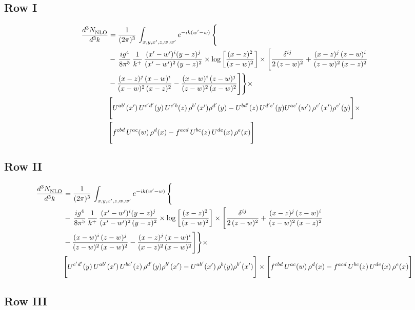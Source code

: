 \documentclass[9pt]{article}
\numberwithin{equation}{section}
\begin{document}
\subsection{Row I}
\begin{align}
     \frac{d^{3}N_{\rm NLO}^{\rm}}{d^{3}k}  & =   \frac{1}{(2\pi)^{3}}\, \int_{x,y,x',z,w,w^{\prime}} e^{-ik(w^{\prime}-w)}\, \Bigg\{\notag \\
& -\,\frac{ig^{4}}{8\pi^{5}}\,\frac{1}{k^{+}}\,\frac{(x'-w')^{i}(y-z)^{j}}{(x'-w')^{2}\,(y-z)^{2}}\times \log{\left[\frac{(x-z)^{2}}{(x-w)^{2}}\right]}\times \Bigg[\frac{\delta^{ij}}{2\,(z-w)^{2}}+\frac{(x-z)^{j}\,(z-w)^{i}}{(z-w)^{2}\,(x-z)^{2}}\notag \\ & -\frac{(x-z)^{j}\,(x-w)^{i}}{(x-w)^{2}\,(x-z)^{2}}-\frac{(x-w)^{i}\,(z-w)^{j}}{(z-w)^{2}\,(x-w)^{2}}\Bigg]\Bigg\}\times \notag \\ &  \Bigg[U^{ab'}(x')\,U^{c'd'}(y)\,U^{c'b}(z)\,\rho^{b'}(x')\rho^{d'}(y)-U^{bd'}(z)\,U^{d'e'}(y)U^{ac'}(w')\,\rho^{c'}(x')\rho^{e'}(y)\Bigg]\times\notag \\ & \Bigg[f^{cbd}\,U^{ac}(w)\,\rho^{d}(x)-f^{acd}\, U^{bc}(z)\,U^{de}(x)\,\rho^{e}(x)\Bigg]
\end{align}
\subsection{Row II}
\begin{align}
     \frac{d^{3}N_{\rm NLO}^{\rm}}{d^{3}k}  & =   \frac{1}{(2\pi)^{3}}\, \int_{x,y,x',z,w,w^{\prime}} e^{-ik(w^{\prime}-w)}\, \Bigg\{\notag \\
& -\,\frac{ig^{4}}{8\pi^{5}}\,\frac{1}{k^{+}}\,\frac{(x'-w')^{i}(y-z)^{j}}{(x'-w')^{2}\,(y-z)^{2}}\times \log{\left[\frac{(x-z)^{2}}{(x-w)^{2}}\right]}\times \Bigg[\frac{\delta^{ij}}{2\,(z-w)^{2}}+\frac{(x-z)^{j}\,(z-w)^{i}}{(z-w)^{2}\,(x-z)^{2}}\notag \\ & -\frac{(x-w)^{i}\,(z-w)^{j}}{(z-w)^{2}\,(x-w)^{2}}-\frac{(x-z)^{j}\,(x-w)^{i}}{(x-z)^{2}\,(x-w)^{2}}\Bigg]\Bigg\}\times \notag \\ & \Bigg[U^{c'd'}(y)\,U^{ab'}(x')\,U^{bc'}(z)\,\rho^{d'}(y)\rho^{b'}(x')-U^{ab'}(x')\,\rho^{b}(y)\rho^{b'}(x')\Bigg]\times\Bigg[f^{cbd}\,U^{ac}(w)\,\rho^{d}(x)-f^{acd}\, U^{bc}(z)\,U^{de}(x)\,\rho^{e}(x)\Bigg]
\end{align}
 \subsection{Row III}
\end{document}
